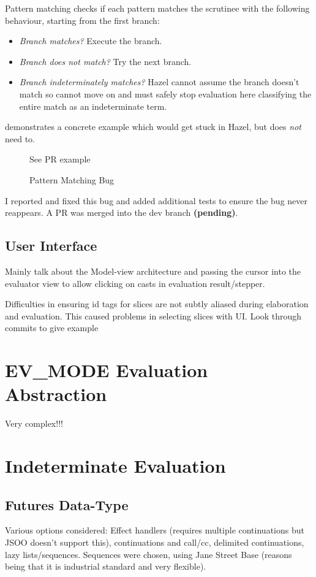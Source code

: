 Pattern matching checks if each pattern matches the scrutinee with the following behaviour, starting from the first branch:
\begin{itemize}
\item \textit{Branch matches?} Execute the branch.
\item \textit{Branch does not match?} Try the next branch.
\item \textit{Branch indeterminately matches?} Hazel cannot assume the branch doesn't match so cannot move on and must safely stop evaluation here classifying the entire match as an indeterminate term.
\end{itemize}
 demonstrates a concrete example which would get stuck in Hazel, but does \textit{not} need to.

\begin{figure}[h]
See PR example
\caption{Pattern Matching Bug}
\label{fig:PatternMatchingBug}
\end{figure}

I reported and fixed this bug and added additional tests to ensure the bug never reappears. A PR was merged into the dev branch \textbf{(pending)}.
\subsection{User Interface}
Mainly talk about the Model-view architecture and passing the cursor into the evaluator view to allow clicking on casts in evaluation result/stepper.

Difficulties in ensuring id tags for slices are not subtly aliased during elaboration and evaluation. This caused problems in selecting slices with UI. Look through commits to give example

\section{EV\_MODE Evaluation Abstraction}
Very complex!!!

\section{Indeterminate Evaluation}\label{sec:IndetEval}


\subsection{Futures Data-Type}\label{sec:Futures}
Various options considered: Effect handlers (requires multiple continuations but JSOO doesn't support this), continuations and call/cc, delimited continuations, lazy lists/sequences. Sequences were chosen, using Jane Street Base (reasons being that it is industrial standard and very flexible).

